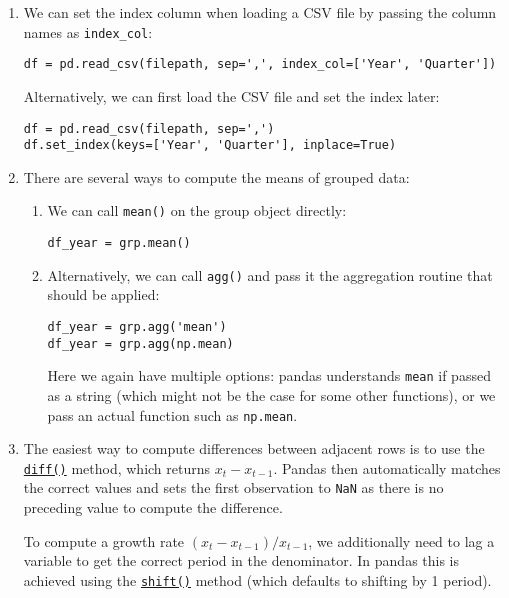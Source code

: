 \documentclass[10pt]{scrartcl}
\begin{document}
\begin{enumerate}
\def\labelenumi{\arabic{enumi}.}
\item
  We can set the index column when loading a CSV file by passing the
  column names as \texttt{index\_col}:

\begin{verbatim}
df = pd.read_csv(filepath, sep=',', index_col=['Year', 'Quarter'])
\end{verbatim}

  Alternatively, we can first load the CSV file and set the index later:

\begin{verbatim}
df = pd.read_csv(filepath, sep=',')
df.set_index(keys=['Year', 'Quarter'], inplace=True)
\end{verbatim}
\item
  There are several ways to compute the means of grouped data:

  \begin{enumerate}
  \def\labelenumii{\arabic{enumii}.}
  \item
    We can call \texttt{mean()} on the group object directly:

\begin{verbatim}
df_year = grp.mean()
\end{verbatim}
  \item
    Alternatively, we can call \texttt{agg()} and pass it the
    aggregation routine that should be applied:

\begin{verbatim}
df_year = grp.agg('mean')
df_year = grp.agg(np.mean)
\end{verbatim}

    Here we again have multiple options: pandas understands
    \texttt{\textquotesingle{}mean\textquotesingle{}} if passed as a
    string (which might not be the case for some other functions), or we
    pass an actual function such as \texttt{np.mean}.
  \end{enumerate}
\item
  The easiest way to compute differences between adjacent rows is to use
  the
  \href{https://pandas.pydata.org/pandas-docs/stable/reference/api/pandas.DataFrame.diff.html}{\texttt{diff()}}
  method, which returns \(x_t - x_{t-1}\). Pandas then automatically
  matches the correct values and sets the first observation to
  \texttt{NaN} as there is no preceding value to compute the difference.

  To compute a growth rate \((x_t - x_{t-1})/x_{t-1}\), we additionally
  need to lag a variable to get the correct period in the denominator.
  In pandas this is achieved using the
  \href{https://pandas.pydata.org/pandas-docs/stable/reference/api/pandas.DataFrame.shift.html}{\texttt{shift()}}
  method (which defaults to shifting by 1 period).
\end{enumerate}
\end{document}
